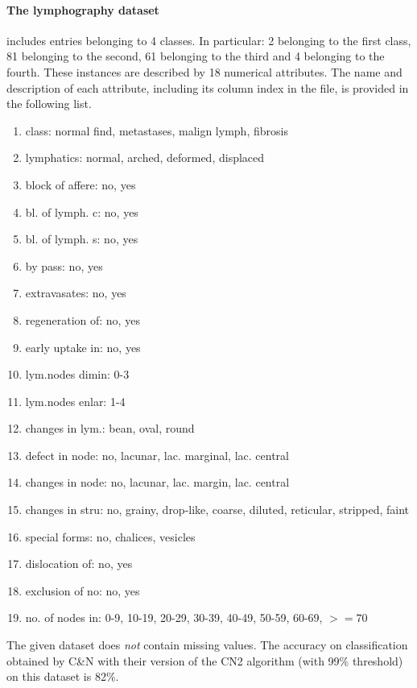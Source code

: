 \documentclass{article}
\begin{document}
\paragraph{The lymphography dataset} includes entries belonging to 4 classes. In particular: 2 belonging to the first class, 81 belonging to the second, 61 belonging to the third and 4 belonging to the fourth. These instances are described by 18 numerical attributes. The name and description of each attribute, including its column index in the file, is provided in the following list.
\begin{enumerate}\addtocounter{enumi}{-1}
    \item class: normal find, metastases, malign lymph, fibrosis
    \item lymphatics: normal, arched, deformed, displaced
    \item block of affere: no, yes
    \item bl. of lymph. c: no, yes
    \item bl. of lymph. s: no, yes
    \item by pass: no, yes
    \item extravasates: no, yes
    \item regeneration of: no, yes
    \item early uptake in: no, yes
    \item lym.nodes dimin: 0-3
    \item lym.nodes enlar: 1-4
    \item changes in lym.: bean, oval, round
    \item defect in node: no, lacunar, lac. marginal, lac. central
    \item changes in node: no, lacunar, lac. margin, lac. central
    \item changes in stru: no, grainy, drop-like, coarse, diluted, reticular, stripped, faint
    \item special forms: no, chalices, vesicles
    \item dislocation of: no, yes
    \item exclusion of no: no, yes
    \item no. of nodes in: 0-9, 10-19, 20-29, 30-39, 40-49, 50-59, 60-69, $>=70$
\end{enumerate}
The given dataset does \textit{not} contain missing values.
\vspace{12pt}\newline
The accuracy on classification obtained by C\&N with their version of the CN2 algorithm (with 99\% threshold) on this dataset is 82\%.
\end{document}
